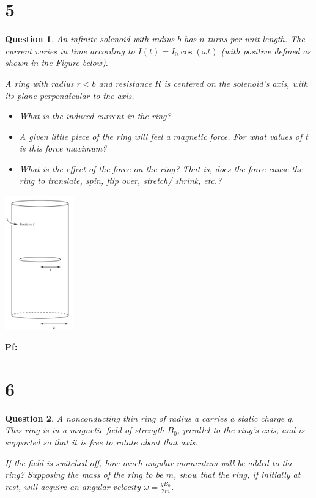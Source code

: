 \documentclass{article}
\newtheorem{question}{Question}
\begin{document}
\section*{5}
\begin{myBox}[]{}
    \begin{question}
        An infinite solenoid with radius $b$ has $n$ turns per unit length. The
        current varies in time according to $I(t) = I_0\cos(\omega t)$ (with positive 
        defined as shown in the Figure below). 
        
        A ring with radius $r < b$ and resistance $R$ is centered on the solenoid’s axis, 
        with its plane perpendicular to the axis.

        \begin{itemize}
            \item[(a)] What is the induced current in the ring?
            \item[(b)] A given little piece of the ring will feel a magnetic force. For
            what values of t is this force maximum?
            \item[(c)] What is the effect of the force on the ring? That is, does the
            force cause the ring to translate, spin, flip over, stretch/
            shrink, etc.?
        \end{itemize}
    \end{question}

    \begin{center}
        \includegraphics*[width=30mm]{7.26.png}
    \end{center}
\end{myBox}

\textbf{Pf:}

\break

\section*{6}
\begin{myBox}[]{}
    \begin{question}
        A nonconducting thin ring of radius a carries a static charge q.
        This ring is in a magnetic field of strength $B_0$, parallel to the ring’s
        axis, and is supported so that it is free to rotate about that axis.

        If the field is switched off, how much angular momentum will be
        added to the ring? Supposing the mass of the ring to be $m$, show
        that the ring, if initially at rest, will acquire an angular velocity
        $\omega=\frac{qB_0}{2m}$.
    \end{question}
\end{myBox}
\end{document}
